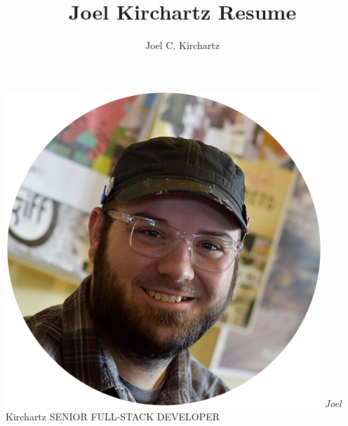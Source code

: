 \documentclass[]{article}
\title{
  Joel Kirchartz Resume
}
\author{
  Joel C. Kirchartz
}
\date{}
\begin{document}

\includegraphics{./in/images/headshot-450.jpg} \Huge \color{blue}
\emph{Joel} Kirchartz \large SENIOR FULL-STACK DEVELOPER

\normalsize
\end{document}
